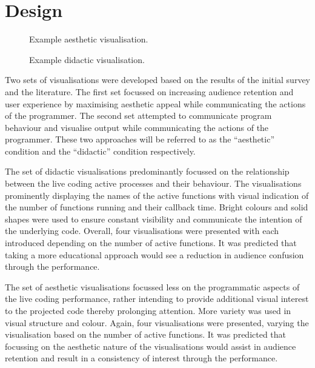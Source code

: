 \documentclass{sig-alternate}
\begin{document}
\section{Design}

\begin{figure}
\centering
{}
\caption{Example aesthetic visualisation.}
\label{fig:aesthetic-visualisation}
\end{figure}

\begin{figure}
\centering
{}
\caption{Example didactic visualisation.}
\label{fig:didactic-visualisation}
\end{figure}

Two sets of visualisations were developed based on the results of the initial survey and the literature. The first set focussed on increasing audience retention and user experience by maximising aesthetic appeal \cite{Cawthon2007} while communicating the actions of the programmer. The second set attempted to communicate program behaviour and visualise output while communicating the actions of the programmer. These two approaches will be referred to as the ``aesthetic'' condition and the ``didactic'' condition respectively.

The set of didactic visualisations predominantly focussed on the relationship between the live coding active processes and their behaviour. The visualisations prominently displaying the names of the active functions with visual indication of the number of functions running and their callback time. Bright colours and solid shapes were used to ensure constant visibility and communicate the intention of the underlying code. Overall, four visualisations were presented with each introduced depending on the number of active functions. It was predicted that taking a more educational approach would see a reduction in audience confusion through the performance.

The set of aesthetic visualisations focussed less on the programmatic aspects of the live coding performance, rather intending to provide additional visual interest to the projected code thereby prolonging attention. More variety was used in visual structure and colour. Again, four visualisations were presented, varying the visualisation based on the number of active functions. It was predicted that focussing on the aesthetic nature of the visualisations would assist in audience retention and result in a consistency of interest through the performance.
\end{document}
